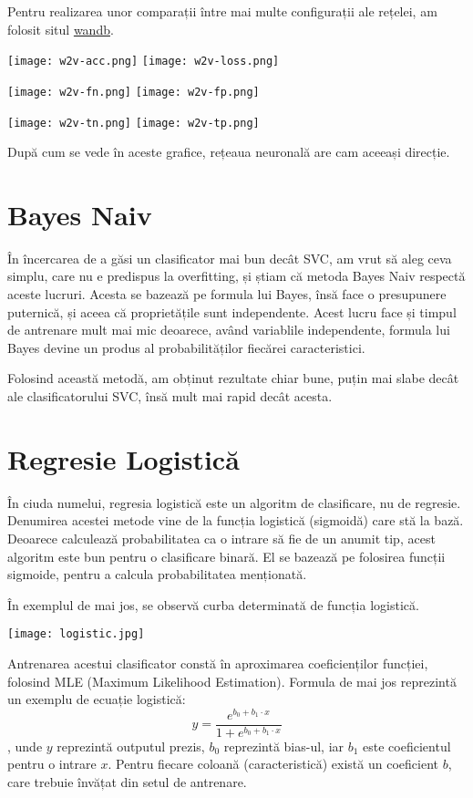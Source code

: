 Pentru realizarea unor comparații între mai multe configurații ale rețelei, am folosit situl \href{https://app.wandb.ai/}{wandb}.

\texttt{[image: w2v-acc.png]}
\texttt{[image: w2v-loss.png]}

\texttt{[image: w2v-fn.png]}
\texttt{[image: w2v-fp.png]}

\texttt{[image: w2v-tn.png]}
\texttt{[image: w2v-tp.png]}

După cum se vede în aceste grafice, rețeaua neuronală are cam aceeași direcție.


\section{Bayes Naiv}

În încercarea de a găsi un clasificator mai bun decât SVC, am vrut să aleg ceva simplu, care nu e predispus la overfitting, și 
știam că metoda Bayes Naiv respectă aceste lucruri. Acesta se bazează pe formula lui Bayes, însă face o presupunere puternică, și
aceea că proprietățile sunt independente. Acest lucru face și timpul de antrenare mult mai mic deoarece, având variablile independente,
formula lui Bayes devine un produs al probabilităților fiecărei caracteristici.

Folosind această metodă, am obținut rezultate chiar bune, puțin mai slabe decât ale clasificatorului SVC, însă mult mai rapid decât acesta.

\section{Regresie Logistică}

În ciuda numelui, regresia logistică este un algoritm de clasificare, nu de regresie. Denumirea acestei metode vine de la funcția logistică (sigmoidă)
care stă la bază. Deoarece calculează probabilitatea ca o intrare să fie de un anumit tip, acest algoritm este bun pentru o clasificare binară.
El se bazează pe folosirea funcții sigmoide, pentru a calcula probabilitatea menționată.

În exemplul de mai jos, se observă curba determinată de funcția logistică.

\texttt{[image: logistic.jpg]}

Antrenarea acestui clasificator constă în aproximarea coeficienților funcției, folosind MLE (Maximum Likelihood Estimation).
Formula de mai jos reprezintă un exemplu de ecuație logistică: \[y = \frac{e^{b_0 + b_{1} \cdot x}}{1 + e^{b_0 + b_{1} \cdot x}}\],
unde \(y\) reprezintă outputul prezis, \(b_0\) reprezintă bias-ul, iar \(b_1\) este coeficientul pentru o intrare \(x\). Pentru fiecare coloană
(caracteristică) există un coeficient \(b\), care trebuie învățat din setul de antrenare.

